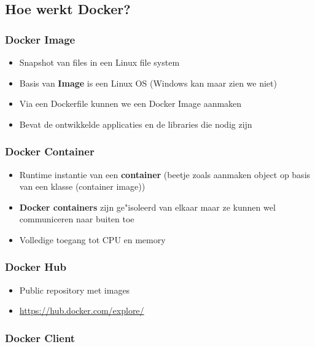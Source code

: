 \documentclass{article}
\newcommand{\bold}[1]{\textbf{#1}}
\begin{document}
\subsection{Hoe werkt Docker?}

\subsubsection{Docker Image}

\begin{itemize}
    \item Snapshot van files in een Linux file system
    \item Basis van \bold{Image} is een Linux OS (Windows kan maar zien we niet)
    \item Via een Dockerfile kunnen we een Docker Image aanmaken
    \item Bevat de ontwikkelde applicaties en de libraries die nodig zijn
\end{itemize}

\subsubsection{Docker Container}

\begin{itemize}
    \item Runtime instantie van een \bold{container} (beetje zoals aanmaken object op basis van een klasse (container image))
    \item \bold{Docker containers} zijn ge"isoleerd van elkaar maar ze kunnen wel communiceren naar buiten toe
    \item Volledige toegang tot CPU en memory 
\end{itemize}

\subsubsection{Docker Hub}

\begin{itemize}
    \item Public repository met images
    \item \url{https://hub.docker.com/explore/}
\end{itemize}

\subsubsection{Docker Client}
\end{document}
